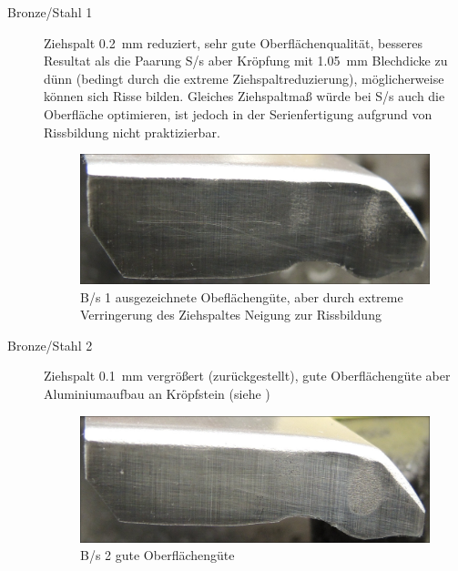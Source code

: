 \documentclass[12pt,a4paper,parskip,twoside,BCOR5mm,headsepline]{scrartcl}
\begin{document}
\begin{description*}
\begin{description}
\item[Bronze/Stahl 1] Ziehspalt \SI{0.2}{\milli\meter} reduziert, sehr gute Oberflächenqualität, besseres Resultat als die Paarung  S/s aber Kröpfung mit \SI{1.05}{\milli\meter} Blechdicke zu dünn (bedingt durch die extreme Ziehspaltreduzierung),  möglicherweise können sich Risse bilden. Gleiches Ziehspaltmaß würde bei S/s auch die Oberfläche optimieren, ist  jedoch in der Serienfertigung aufgrund von Rissbildung nicht praktizierbar.
\begin{figure}[H]
\centering
\includegraphics[width=.8\textwidth]{Bs1a}
\caption{B/s 1 ausgezeichnete Obeflächengüte, aber durch extreme Verringerung des Ziehspaltes Neigung zur Rissbildung}
\label{fig:Bs1a}
\end{figure}

\item[Bronze/Stahl 2] Ziehspalt \SI{0.1}{\milli\meter} vergrößert (zurückgestellt), gute Oberflächengüte aber Aluminiumaufbau an Kröpfstein (siehe )
\begin{figure}[H]
\centering
\includegraphics[width=.8\textwidth]{Bs2}
\caption{B/s 2 gute Oberflächengüte}
\label{fig:Bs2}
\end{figure}
\newpage


\end{description}
\end{description*}
\end{document}
